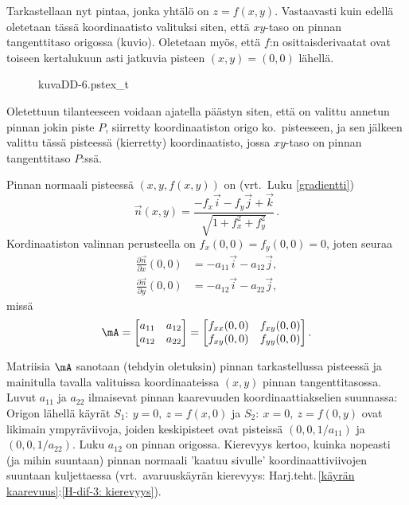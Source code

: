 \vspace{2mm}
\begin{multicols}{2} \raggedcolumns
Tarkastellaan nyt pintaa, jonka yhtälö on $z=f(x,y)$. Vastaavasti kuin edellä oletetaan tässä
koordinaatisto valituksi siten, että $xy$-taso on pinnan tangenttitaso origossa (kuvio).
Oletetaan myös, että $f$:n osittaisderivaatat ovat toiseen kertalukuun asti jatkuvia pisteen
$(x,y)=(0,0)$ lähellä.
\begin{figure}[H]
\begin{center}
{kuvaDD-6.pstex_t}
\end{center}
\end{figure}
\end{multicols}
Oletettuun tilanteeseen voidaan ajatella päästyn siten, että on valittu annetun pinnan jokin
piste $P$, siirretty koordinaatiston origo ko.\ pisteeseen, ja sen jälkeen valittu tässä 
pisteessä (kierretty) koordinaatisto, jossa $xy$-taso on pinnan tangenttitaso $P$:ssä.

Pinnan normaali pisteessä $(x,y,f(x,y))$ on (vrt.\ Luku \ref{gradientti})
\[
\vec n(x,y)=\frac{-f_x\vec i-f_y\vec j+\vec k}{\sqrt{1+f_x^2+f_y^2}}\,.
\]
Kordinaatiston valinnan perusteella on $f_x(0,0)=f_y(0,0)=0$, joten seuraa
\begin{align*}
\frac{\partial\vec n}{\partial x}(0,0) &= -a_{11}\vec i-a_{12}\vec j, \\
\frac{\partial\vec n}{\partial y}(0,0) &= -a_{12}\vec i-a_{22}\vec j,
\end{align*}
missä
\[
\mA=\begin{bmatrix} a_{11} & a_{12} \\ a_{12} & a_{22} \end{bmatrix}
   =\begin{bmatrix} f_{xx}(0,0) & f_{xy}(0,0) \\ f_{xy}(0,0) & f_{yy}(0,0) \end{bmatrix}.
\]

%
Matriisia $\mA$ sanotaan (tehdyin oletuksin) pinnan  tarkastellussa
pisteessä ja mainitulla tavalla valituissa koordinaateissa $(x,y)$ pinnan tangenttitasossa.
Luvut $a_{11}$ ja $a_{22}$ ilmaisevat pinnan kaarevuuden koordinaattiakselien suunnassa: Origon 
lähellä käyrät $S_1: \ y=0, \ z=f(x,0)$ ja $S_2: \ x=0, \ z=f(0,y)$ ovat likimain ympyräviivoja,
joiden keskipisteet ovat pisteissä $(0,0,1/a_{11})$ ja $(0,0,1/a_{22})$. Luku $a_{12}$ on pinnan
%
 origossa. Kierevyys kertoo, kuinka nopeasti (ja mihin suuntaan) pinnan normaali
'kaatuu sivulle' koordinaattiviivojen suuntaan kuljettaessa (vrt.\ avaruuskäyrän kierevyys:
Harj.teht.\,\ref{käyrän kaarevuus}:\ref{H-dif-3: kierevyys}).

